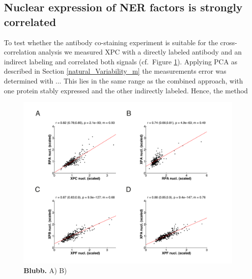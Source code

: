 \subsection{Nuclear expression of NER factors is strongly correlated}
To test whether the antibody co-staining experiment is suitable for the cross-correlation analysis we measured XPC with a directly labeled antibody and an indirect labeling and correlated both signals (cf.\ Figure \ref{fig:coExpressionData}). Applying PCA as described in Section \ref{natural_Variability_m} the measurements error was determined with ... This lies in the same range as the combined approach, with one protein stably expressed and the other indirectly labeled. Hence, the method     
   

\begin{figure}[htbp]
	\begin{center}
		\includegraphics[width=1\textwidth]{Abbildungen/figure4_2.pdf}
		\caption{\textbf{Blubb.} A) B) }
		\label{fig:coExpressionData}
	\end{center}
\end{figure}



